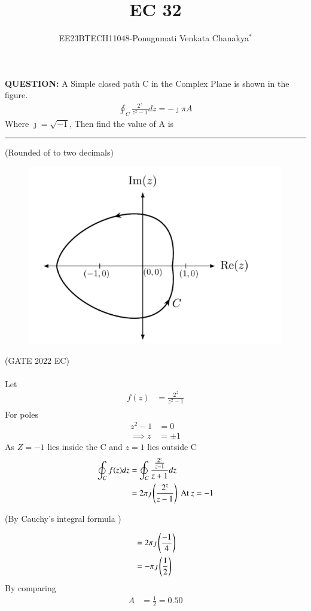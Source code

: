 \documentclass[journal,12pt,twocolumn]{IEEEtran}
\theoremstyle{remark}
\begin{document}
 
 \vspace{3cm}
 \title{\textbf{EC 32}}
 \author{EE23BTECH11048-Ponugumati Venkata Chanakya$^{*}$%
 }
 \maketitle

 \bigskip
 \renewcommand{\thefigure}{\theenumi}
 \renewcommand{\thetable}{\theenumi}
 \textbf{QUESTION:}
 A Simple closed path C in the Complex Plane is shown in the figure.
 \begin{align*}
        \oint_C \frac{2^z}{z^2-1}dz=-\jmath \pi A
 \end{align*}
 Where $\jmath=\sqrt{-1}$, Then find the value of A is \rule{1cm}{0.15mm}(Rounded of to two decimals)
\begin{figure}[h!]
    \centering
    \includegraphics[width = \columnwidth]{figs/fig1.png}
\end{figure}
\hfill{(GATE 2022 EC)}\\
\solution \\

 Let\\
 \begin{align*}
 f(z)&=\frac{2^z}{z^2-1}\\
 \end{align*}
 For poles
 \begin{align}
     z^2-1&=0\\
    \implies z&=\pm1
 \end{align}
 As $Z=-1$ lies inside the C  and $z=1$ lies outside C
 \begin{align}
      \oint_C f(z)dz&= \oint_C\frac{\frac{2^z}{z-1}}{z+1}dz\\
      &=2\pi \jmath \left(\frac{2^z}{z-1}\right) \text{ At }z=-1
      \end{align}
\begin{center}
    (By Cauchy's integral formula )
\end{center}
      \begin{align}
      &=2\pi \jmath \left(\frac{-1}{4}\right)\\
      &=-\pi \jmath \left(\frac{1}{2}\right)
 \end{align}
 By comparing\\
 \begin{align}
 A&=\frac{1}{2}=0.50
 \end{align}
 
\end{document}
